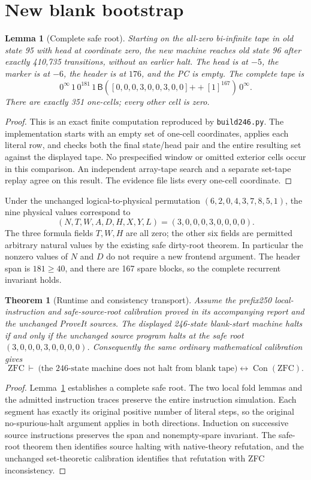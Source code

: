 \documentclass[11pt]{article}
\newtheorem{lemma}{Lemma}
\newtheorem{theorem}{Theorem}
\newcommand{\B}{\mathsf B}
\newcommand{\Con}{\operatorname{Con}}
\begin{document}
\section{New blank bootstrap}

\begin{lemma}[Complete safe root]\label{lem:boot}
Starting on the all-zero bi-infinite tape in old state 95 with head at
coordinate zero, the new machine reaches old state 96 after exactly
410,735 transitions, without an earlier halt. The head is at $-5$,
the marker is at $-6$, the header is at $176$, and the PC is empty.
The complete tape is
\[
 0^\infty\,1\,0^{181}\,1\,
 \B([0,0,0,3,0,0,3,0,0]\mathbin{+\!+}[1]^{167})\,0^\infty.
\]
There are exactly 351 one-cells; every other cell is zero.
\end{lemma}
\begin{proof}
This is an exact finite computation reproduced by \texttt{build246.py}.
The implementation starts with an empty set of one-cell coordinates,
applies each literal row, and checks both the final state/head pair and
the entire resulting set against the displayed tape. No prespecified
window or omitted exterior cells occur in this comparison. An independent
array-tape search and a separate set-tape replay agree on this result.
The evidence file lists every one-cell coordinate.
\end{proof}

Under the unchanged logical-to-physical permutation
$(6,2,0,4,3,7,8,5,1)$, the nine physical values correspond to
\[
 (N,T,W,A,D,H,X,Y,L)=(3,0,0,0,3,0,0,0,0).
\]
The three formula fields $T,W,H$ are all zero; the other six fields are
permitted arbitrary natural values by the existing safe dirty-root
theorem. In particular the nonzero values of $N$ and $D$ do not require
a new frontend argument. The header span is $181\ge40$, and there are
167 spare blocks, so the complete recurrent invariant holds.

\begin{theorem}[Runtime and consistency transport]
Assume the prefix250 local-instruction and safe-source-root calibration
proved in its accompanying report and the unchanged ProveIt sources.
The displayed 246-state blank-start machine halts if and only if the
unchanged source program halts at the safe root
$(3,0,0,0,3,0,0,0,0)$. Consequently the same ordinary mathematical
calibration gives
\[
 \mathrm{ZFC}\ \vdash\
 \bigl(\text{the 246-state machine does not halt from blank tape}\bigr)
 \longleftrightarrow \Con(\mathrm{ZFC}).
\]
\end{theorem}
\begin{proof}
Lemma~\ref{lem:boot} establishes a complete safe root. The two local
fold lemmas and the admitted instruction traces preserve the entire
instruction simulation. Each segment has exactly its original positive
number of literal steps, so the original no-spurious-halt argument
applies in both directions. Induction on successive source instructions
preserves the span and nonempty-spare invariant. The safe-root theorem
then identifies source halting with native-theory refutation, and the
unchanged set-theoretic calibration identifies that refutation with
ZFC inconsistency.
\end{proof}
\end{document}
